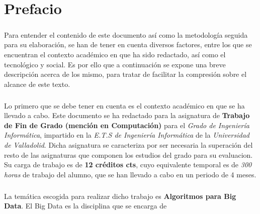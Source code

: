 \documentclass{subfiles}
\begin{document}
  \chapter*{Prefacio}

    \paragraph{}
    Para entender el contenido de este documento así como la metodología seguida para su elaboración, se han de tener en cuenta diversos factores, entre los que se encuentran el contexto académico en que ha sido redactado, así como el tecnológico y social. Es por ello que a continuación se expone una breve descripción acerca de los mismo, para tratar de facilitar la compresión sobre el alcance de este texto.

    \paragraph{}
    Lo primero que se debe tener en cuenta es el contexto académico en que se ha llevado a cabo. Este documento se ha redactado para la asignatura de \textbf{Trabajo de Fin de Grado (mención en Computación)} para el \emph{Grado de Ingeniería Informática}, impartido en la \emph{E.T.S de Ingeniería Informática} de la \emph{Universidad de Valladolid}. Dicha asignatura se caracteriza por ser necesaria la superación del resto de las asignaturas que componen los estudios del grado para su evaluacion. Su carga de trabajo es de \textbf{12 créditos cts}, cuyo equivalente temporal es de \emph{300 horas} de trabajo del alumno, que se han llevado a cabo en un periodo de 4 meses.

    \paragraph{}
    La temática escogida para realizar dicho trabajo es \textbf{Algoritmos para Big Data}. El Big Data es la disciplina que se encarga de \cite{wiki:big_data}
\end{document}
